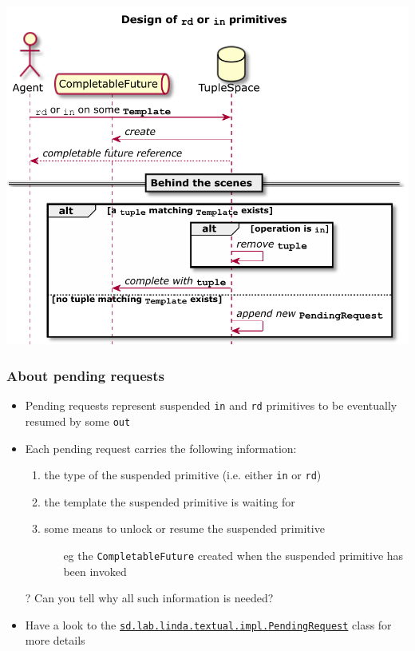 \documentclass[presentation]{beamer}\mode<presentation>{\usetheme{AMSCesenaPurpleAndGold}}
\begin{document}
\begin{frame}

\begin{center}
	\includegraphics[width=.8\linewidth]{./img/rd-and-in-design.pdf}
\end{center}

\end{frame}

\begin{frame}
\frametitle{About pending requests}

\begin{itemize}
	\item Pending requests represent \alert{suspended} \texttt{in} and \texttt{rd} primitives to be eventually resumed by some \texttt{out}
	
	\vfill
	
	\item Each pending request carries the following information:
	\begin{enumerate}
		\item the \alert{type} of the suspended primitive (i.e. either \texttt{in} or \texttt{rd})
		\item the \alert{template} the suspended primitive is waiting for
		\item some means to \alert{unlock} or resume the suspended primitive
		\begin{itemize}
			\item[eg] the \texttt{\alert{CompletableFuture}} created when the suspended primitive has been invoked
		\end{itemize}
	\end{enumerate}

	\vfill
	
	\item[?] Can you tell \alert{why} all such information is needed?
	
	\vfill
	
	\item Have a look to the \href{https://gitlab.com/pika-lab/courses/ds/aa1920/lab-04/blob/master/src/main/java/sd/lab/linda/textual/impl/PendingRequest.java}{\texttt{sd.lab.linda.textual.impl.\alert{PendingRequest}}} class for more details
\end{itemize}

\end{frame}
\end{document}
